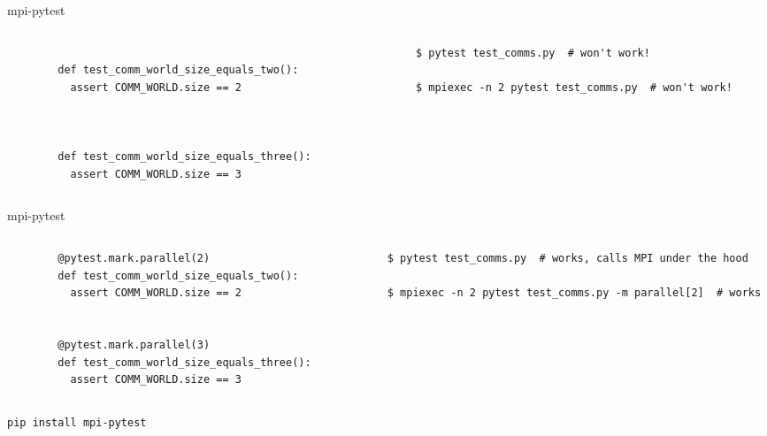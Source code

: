 \documentclass[
	aspectratio=169, %
	t, %
	onlytextwidth, %
	10pt, %
]{beamer}
\begin{document}
\begin{frame}[t,fragile]{mpi-pytest}
  \vspace{3em}

  \begin{columns}
    \begin{column}{.4\textwidth}
      \begin{verbatim}

        def test_comm_world_size_equals_two():
          assert COMM_WORLD.size == 2



        def test_comm_world_size_equals_three():
          assert COMM_WORLD.size == 3
      \end{verbatim}
    \end{column}
    \begin{column}{.6\textwidth}
      \begin{verbatim}
        $ pytest test_comms.py  # won't work!

        $ mpiexec -n 2 pytest test_comms.py  # won't work!
      \end{verbatim}
    \end{column}
  \end{columns}
\end{frame}

\begin{frame}[t,fragile]{mpi-pytest}
  \vspace{3em}

  \begin{columns}
    \begin{column}{.4\textwidth}
      \begin{verbatim}
        @pytest.mark.parallel(2)
        def test_comm_world_size_equals_two():
          assert COMM_WORLD.size == 2


        @pytest.mark.parallel(3)
        def test_comm_world_size_equals_three():
          assert COMM_WORLD.size == 3
      \end{verbatim}
    \end{column}
    \begin{column}{.6\textwidth}
      \begin{verbatim}
        $ pytest test_comms.py  # works, calls MPI under the hood

        $ mpiexec -n 2 pytest test_comms.py -m parallel[2]  # works
      \end{verbatim}
    \end{column}
  \end{columns}

  \vspace{2em}

  \pause

  \begin{center}
    \footnotesize{\texttt{pip install mpi-pytest}}
  \end{center}
\end{frame}
\end{document}
